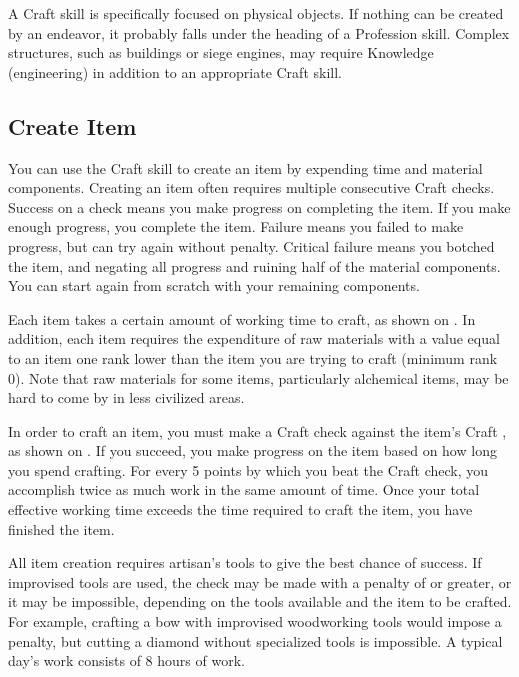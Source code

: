 
    A Craft skill is specifically focused on physical objects. If nothing can be created by an endeavor, it probably falls under the heading of a Profession skill. Complex structures, such as buildings or siege engines, may require Knowledge (engineering) in addition to an appropriate Craft skill.

    \subsection{Create Item}
        You can use the Craft skill to create an item by expending time and material components. Creating an item often requires multiple consecutive Craft checks. Success on a check means you make progress on completing the item. If you make enough progress, you complete the item. Failure means you failed to make progress, but can try again without penalty. Critical failure means you botched the item, and negating all progress and ruining half of the material components. You can start again from scratch with your remaining components.

        Each item takes a certain amount of working time to craft, as shown on .
        In addition, each item requires the expenditure of raw materials with a value equal to an item one rank lower than the item you are trying to craft (minimum rank 0).
        Note that raw materials for some items, particularly alchemical items, may be hard to come by in less civilized areas.

        In order to craft an item, you must make a Craft check against the item's Craft , as shown on .
        If you succeed, you make progress on the item based on how long you spend crafting.
        For every 5 points by which you beat the Craft check, you accomplish twice as much work in the same amount of time.
        Once your total effective working time exceeds the time required to craft the item, you have finished the item.

        All item creation requires artisan's tools to give the best chance of success. If improvised tools are used, the check may be made with a penalty of  or greater, or it may be impossible, depending on the tools available and the item to be crafted. For example, crafting a bow with improvised woodworking tools would impose a  penalty, but cutting a diamond without specialized tools is impossible. A typical day's work consists of 8 hours of work.

